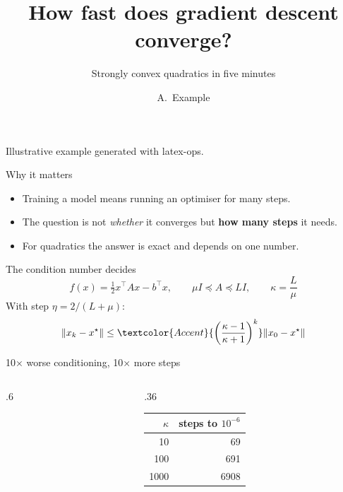 \documentclass[aspectratio=169,14pt]{beamer}
\title{How fast does gradient descent converge?}
\subtitle{Strongly convex quadratics in five minutes}
\author{A.\ Example}
\date{}
\newcommand{\HL}[1]{{\color{Accent}\bfseries #1}}
\newcommand{\HLmath}[1]{\textcolor{Accent}{#1}}
\begin{document}
\begin{frame}[plain]
  \vfill\titlepage\vfill
  {\footnotesize\color{Muted}Illustrative example generated with latex-ops.\par}
\end{frame}

\begin{frame}{Why it matters}
  \begin{itemize}\setlength{\itemsep}{.8em}
    \item Training a model means running an optimiser for many steps.
    \item The question is not \emph{whether} it converges but \HL{how many steps} it needs.
    \item For quadratics the answer is exact and depends on one number.
  \end{itemize}
\end{frame}

\begin{frame}{The condition number decides}
  \[
    f(x) = \tfrac12 x^\top A x - b^\top x, \qquad \mu I \preceq A \preceq L I, \qquad
    \kappa = \frac{L}{\mu}
  \]
  \vspace{.6em}
  With step $\eta = 2/(L+\mu)$:
  \[
    \lVert x_k - x^\star \rVert \le \HLmath{\left(\frac{\kappa-1}{\kappa+1}\right)^{k}}
    \lVert x_0 - x^\star \rVert
  \]
\end{frame}

\begin{frame}{10× worse conditioning, 10× more steps}
  \begin{columns}[T]
    \begin{column}{.6\textwidth}
    \end{column}
    \begin{column}{.36\textwidth}
      \vspace{1em}\small
      \begin{tabular}{rr}
        \toprule
        $\kappa$ & steps to $10^{-6}$ \\
        \midrule
        10 & 69 \\
        100 & 691 \\
        1000 & 6908 \\
        \bottomrule
      \end{tabular}
    \end{column}
  \end{columns}
\end{frame}
\end{document}
